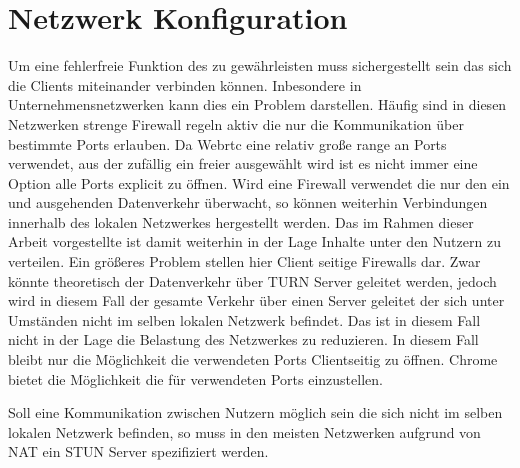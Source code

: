 


\section{Netzwerk Konfiguration}

Um eine fehlerfreie Funktion des \cdns zu gewährleisten muss sichergestellt sein das sich die Clients miteinander verbinden können. Inbesondere in Unternehmensnetzwerken kann dies ein Problem darstellen. Häufig sind in diesen Netzwerken strenge Firewall regeln aktiv die nur die Kommunikation über bestimmte Ports erlauben. Da Webrtc eine relativ große range an Ports verwendet, aus der zufällig ein freier ausgewählt wird ist es nicht immer eine Option alle Ports explicit zu öffnen. Wird eine Firewall verwendet die nur den ein und ausgehenden Datenverkehr überwacht, so können weiterhin Verbindungen innerhalb des lokalen Netzwerkes hergestellt werden. Das im Rahmen dieser Arbeit vorgestellte \cdn ist damit weiterhin in der Lage Inhalte unter den Nutzern zu verteilen. Ein größeres Problem stellen hier Client seitige Firewalls dar. Zwar könnte theoretisch der Datenverkehr über TURN Server geleitet werden, jedoch wird in diesem Fall der gesamte Verkehr über einen Server geleitet der sich unter Umständen nicht im selben lokalen Netzwerk befindet. Das \cdn ist in diesem Fall nicht in der Lage die Belastung des Netzwerkes zu reduzieren. In diesem Fall bleibt nur die Möglichkeit die verwendeten Ports Clientseitig zu öffnen. Chrome bietet die Möglichkeit die für \webrtc verwendeten Ports einzustellen.\cite{chrome-port-range} 

Soll eine Kommunikation zwischen Nutzern möglich sein die sich nicht im selben lokalen Netzwerk befinden, so muss in den meisten Netzwerken aufgrund von NAT ein STUN Server spezifiziert werden.  
